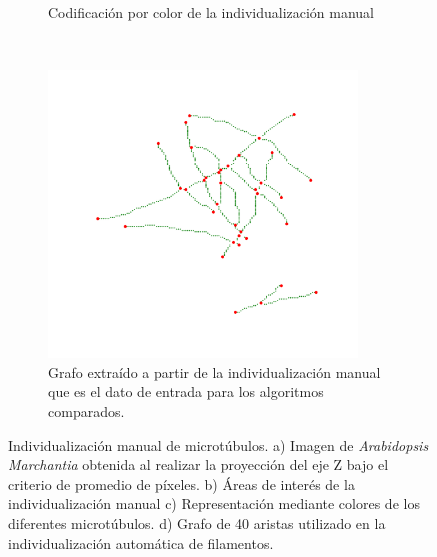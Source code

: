 \begin{figure}[h!]
\begin{subfigure}[t]{0.49\textwidth}
        \caption{Codificaci\'on por color de la individualizaci\'on manual}
        \label{fig:field3t0filtered1-indivManual}
    \end{subfigure}
    ~
    \begin{subfigure}[t]{0.49\textwidth}
        \centering
        \includegraphics[height=3in]{benchImages/field3-t0-2cellBcrop-filtered-graph-thick.png}
        \caption{Grafo extra\'ido a partir de la individualizaci\'on manual que es el dato de entrada para los algoritmos comparados.}
        \label{fig:field3t0filtered1-graph}
    \end{subfigure}
    \caption{Individualizaci\'on manual de microt\'ubulos. a) Imagen de {\it Arabidopsis Marchantia} obtenida al realizar la proyecci\'on del eje Z bajo el criterio de promedio de p\'ixeles. b) \'Areas de inter\'es de la individualizaci\'on manual c) Representaci\'on mediante colores de los diferentes microt\'ubulos. d) Grafo de 40 aristas utilizado en la individualizaci\'on autom\'atica de filamentos.}
    \label{fig:field3t0filtered1}
\end{figure}



